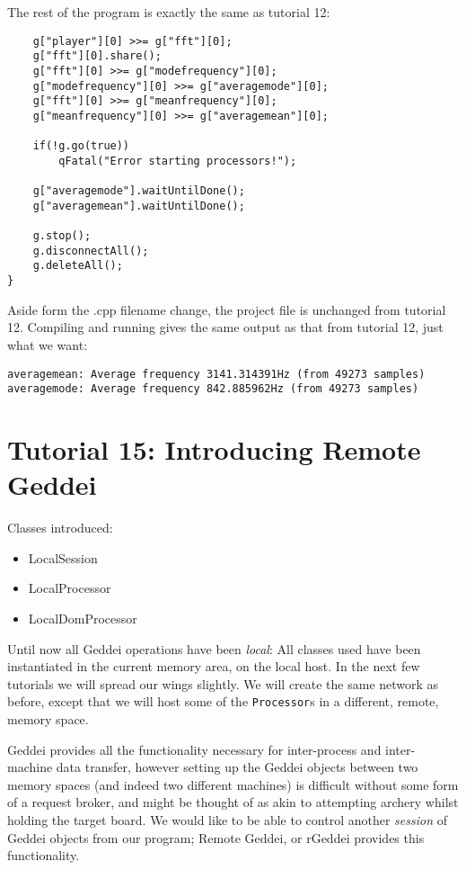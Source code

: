 The rest of the program is exactly the same as tutorial 12:

\begin{verbatim}
    g["player"][0] >>= g["fft"][0];
    g["fft"][0].share();
    g["fft"][0] >>= g["modefrequency"][0];
    g["modefrequency"][0] >>= g["averagemode"][0];
    g["fft"][0] >>= g["meanfrequency"][0];
    g["meanfrequency"][0] >>= g["averagemean"][0];

    if(!g.go(true))
        qFatal("Error starting processors!");

    g["averagemode"].waitUntilDone();
    g["averagemean"].waitUntilDone();

    g.stop();
    g.disconnectAll();
    g.deleteAll();
}
\end{verbatim}

Aside form the .cpp filename change, the project file is unchanged from tutorial 12. Compiling and running gives the same output as that from tutorial 12, just what we want:

\begin{verbatim}
averagemean: Average frequency 3141.314391Hz (from 49273 samples)
averagemode: Average frequency 842.885962Hz (from 49273 samples)
\end{verbatim}




\section{Tutorial 15: Introducing Remote Geddei}

Classes introduced:
\begin{itemize}
\item LocalSession
\item LocalProcessor
\item LocalDomProcessor
\end{itemize}

Until now all Geddei operations have been \textit{local}: All classes used have been instantiated in the current memory area, on the local host. In the next few tutorials we will spread our wings slightly. We will create the same network as before, except that we will host some of the \texttt{Processor}s in a different, remote, memory space.

Geddei provides all the functionality necessary for inter-process and inter-machine data transfer, however setting up the Geddei objects between two memory spaces (and indeed two different machines) is difficult without some form of a request broker, and might be thought of as akin to attempting archery whilst holding the target board. We would like to be able to control another \textit{session} of Geddei objects from our program; Remote Geddei, or rGeddei provides this functionality.

